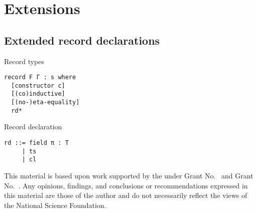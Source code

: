 \documentclass[acmlarge]{acmart}\settopmatter{}
\renewcommand{\|}{\mid}
\begin{document}
\section{Extensions}
\label{sec:extensions}

\subsection{Extended record declarations}

Record types
\begin{verbatim}
record F Γ : s where
  [constructor c]
  [(co)inductive]
  [(no-)eta-equality]
  rd*
\end{verbatim}

Record declaration
\begin{verbatim}
rd ::= field π : T
     | ts
     | cl
\end{verbatim}


\begin{acks}                            %
  This material is based upon work supported by the
   under Grant
  No.~ and Grant
  No.~.  Any opinions, findings, and
  conclusions or recommendations expressed in this material are those
  of the author and do not necessarily reflect the views of the
  National Science Foundation.
\end{acks}


%


\end{document}
